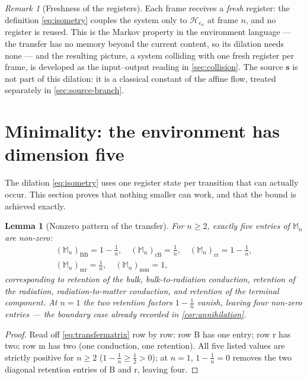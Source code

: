 \documentclass[11pt]{amsbook}
\theoremstyle{plain}
\newtheorem{lemma}[theorem]{Lemma}
\theoremstyle{definition}
\theoremstyle{remark}
\newtheorem{remark}[theorem]{Remark}
\newcommand{\uses}[1]{\par\nopagebreak\noindent{\footnotesize\emph{Uses: #1.}\par}}
\begin{document}
\begin{remark}[Freshness of the registers]\label{rem:fresh}
Each frame receives a \emph{fresh} register: the definition \cref{eq:isometry} couples the system only to $\mathcal H_{e_{n}}$ at frame $n$, and no register is reused. This is the Markov property in the environment language --- the transfer has no memory beyond the current content, so its dilation needs none --- and the resulting picture, a system colliding with one fresh register per frame, is developed as the input--output reading in \cref{sec:collision}. The source $\boldsymbol{s}$ is not part of this dilation: it is a classical constant of the affine flow, treated separately in \cref{sec:source-branch}.
\end{remark}

\section{Minimality: the environment has dimension five}\label{sec:minimality}

The dilation \cref{eq:isometry} uses one register state per transition that can actually occur. This section proves that nothing smaller can work, and that the bound is achieved exactly.

\begin{lemma}[Nonzero pattern of the transfer]\label{lem:pattern}
For $n \geq 2$, exactly five entries of $\mathbb{M}_{n}$ are non-zero:
\begin{equation}\label{eq:pattern}
\begin{gathered}
(\mathbb{M}_{n})_{\mathrm{BB}} = 1 - \frac{1}{n},\quad
(\mathbb{M}_{n})_{\mathrm{rB}} = \frac{1}{n},\quad
(\mathbb{M}_{n})_{\mathrm{rr}} = 1 - \frac{1}{n},\\
(\mathbb{M}_{n})_{\mathrm{mr}} = \frac{1}{n},\quad
(\mathbb{M}_{n})_{\mathrm{mm}} = 1,
\end{gathered}
\end{equation}
corresponding to retention of the bulk, bulk-to-radiation conduction, retention of the radiation, radiation-to-matter conduction, and retention of the terminal component. At $n = 1$ the two retention factors $1 - \tfrac1n$ vanish, leaving four non-zero entries --- the boundary case already recorded in \cref{cor:annihilation}.
\uses{\cref{eq:transfermatrix}}
\end{lemma}

\begin{proof}
Read off \cref{eq:transfermatrix} row by row: row $\mathrm B$ has one entry; row $\mathrm r$ has two; row $\mathrm m$ has two (one conduction, one retention). All five listed values are strictly positive for $n \geq 2$ ($1 - \tfrac1n \geq \tfrac12 > 0$); at $n = 1$, $1 - \tfrac1n = 0$ removes the two diagonal retention entries of $\mathrm B$ and $\mathrm r$, leaving four.
\end{proof}
\end{document}
